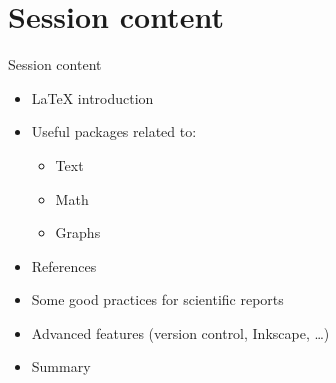 \documentclass{beamer}
\begin{document}
\begin{frame}
\titlepage
\end{frame}

\section{Session content}
\begin{frame}{Session content}
\begin{itemize}
    \item \LaTeX{} introduction
    \item Useful packages related to:
    \begin{itemize}
        \item Text 
        \item Math 
        \item Graphs
    \end{itemize}
    \item References
    \item Some good practices for scientific reports
    \item Advanced features (version control, Inkscape, \ldots)
    \item Summary
\end{itemize}
    
\end{frame}
\end{document}
